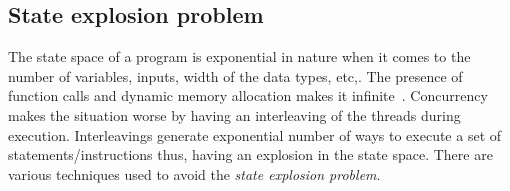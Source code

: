 %
%

\subsection{State explosion problem \label{state_exp_prob}}

The state space of a program is exponential in nature when it comes to the number of variables, inputs, width of the data types, etc,. 
The presence of function calls and dynamic memory allocation makes it infinite~\citep{d2008survey}. 
Concurrency makes the situation worse by having an interleaving of the threads during execution. 
Interleavings generate exponential number of ways to execute a set of statements/instructions thus, having an explosion in the state space. 
There are various techniques used to avoid the \emph{state explosion problem}. 
 
